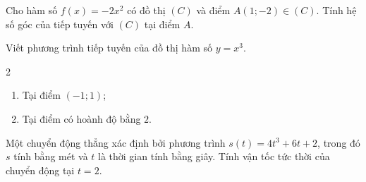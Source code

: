 \begin{bt}%
	Cho hàm số $f(x)=-2 x^2$ có đồ thị $(C)$ và điểm $A(1 ;-2) \in(C)$. Tính hệ số góc của tiếp tuyến với $(C)$ tại điểm $A$.
\end{bt}

\begin{bt}%
	Viết phương trình tiếp tuyến của đồ thị hàm số $y=x^3$.
	\begin{multicols}{2}
	\begin{enumerate}
		\item Tại điểm $(-1 ; 1)$;
		\item Tại điểm có hoành độ bằng $2$.
	\end{enumerate}
	\end{multicols}	
\end{bt}

\begin{bt}%
	Một chuyển động thẳng xác định bởi phương trình $s(t)=4 t^3+6 t+2$, trong đó $s$ tính bằng mét và $t$ là thời gian tính bằng giây. Tính vận tốc tức thời của chuyển động tại $t=2$.
\end{bt}

